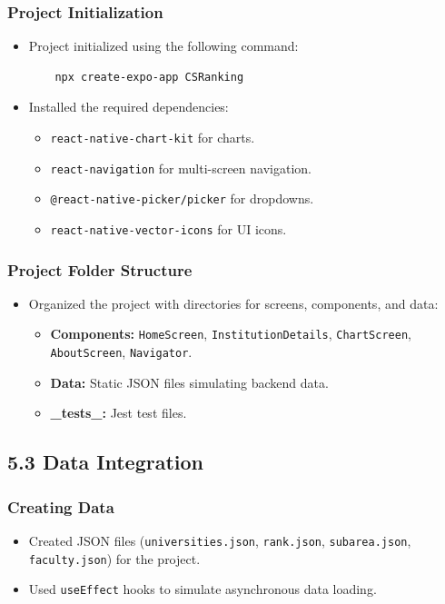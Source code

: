\documentclass[12pt]{article}
\begin{document}
\subsubsection*{Project Initialization}
\begin{itemize}
    \item Project initialized using the following command:
    \begin{verbatim}
    npx create-expo-app CSRanking
    \end{verbatim}
    \item Installed the required dependencies:
    \begin{itemize}
        \item \texttt{react-native-chart-kit} for charts.
        \item \texttt{react-navigation} for multi-screen navigation.
        \item \texttt{@react-native-picker/picker} for dropdowns.
        \item \texttt{react-native-vector-icons} for UI icons.
    \end{itemize}
\end{itemize}

\subsubsection*{Project Folder Structure}
\begin{itemize}
    \item Organized the project with directories for screens, components, and data:
    \begin{itemize}
        \item \textbf{Components:} \texttt{HomeScreen}, \texttt{InstitutionDetails}, \texttt{ChartScreen}, \texttt{AboutScreen}, \texttt{Navigator}.
        \item \textbf{Data:} Static JSON files simulating backend data.
        \item \textbf{\_tests\_:} Jest test files.
    \end{itemize}
\end{itemize}

\bigskip
\subsection*{5.3 Data Integration}

\subsubsection*{Creating Data}
\begin{itemize}
    \item Created JSON files (\texttt{universities.json}, \texttt{rank.json}, \texttt{subarea.json}, \texttt{faculty.json}) for the project.
    \item Used \texttt{useEffect} hooks to simulate asynchronous data loading.
\end{itemize}
\end{document}
